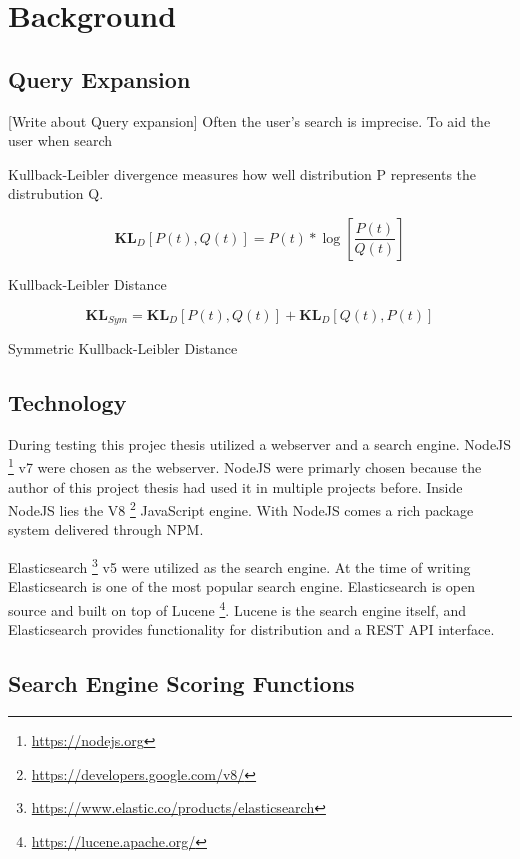 \chapter{Background}
\label{ch:background}

\section{Query Expansion}
[Write about Query expansion]
Often the user's search is imprecise.
To aid the user when search

Kullback-Leibler divergence measures how well distribution P represents the distrubution Q.


\begin{cequation}[H]
	\begin{equation}
	    \label{equ:line}
		\mathbf{KL}_D[P(t), Q(t)] = P(t)*\log{[\frac{P(t)}{Q(t)}]}
	\end{equation}
	\caption{Kullback-Leibler Distance}
  \label{kl-distance}
\end{cequation}

\begin{cequation}[H]
	\begin{equation}
	    \label{equ:line}
		\mathbf{KL}_{Sym} = \mathbf{KL}_D[P(t), Q(t)] + \mathbf{KL}_D[Q(t), P(t)]
	\end{equation}
	\caption{Symmetric Kullback-Leibler Distance}
  \label{kl-distance-sym}
\end{cequation}


\section{Technology}
During testing this projec thesis utilized a webserver and a search engine.
NodeJS \footnote{\url{https://nodejs.org}} v7 were chosen as the webserver.
NodeJS were primarly chosen because the author of this project thesis had used it in multiple projects before.
Inside NodeJS lies the V8 \footnote{\url{https://developers.google.com/v8/}} JavaScript engine.
With NodeJS comes a rich package system delivered through NPM.

Elasticsearch \footnote{\url{https://www.elastic.co/products/elasticsearch}} v5 were utilized as the search engine.
At the time of writing Elasticsearch is one of the most popular search engine.
Elasticsearch is open source and built on top of Lucene \footnote{\url{https://lucene.apache.org/}}.
Lucene is the search engine itself,
and Elasticsearch provides functionality for distribution and a REST API interface.

\section{Search Engine Scoring Functions}
